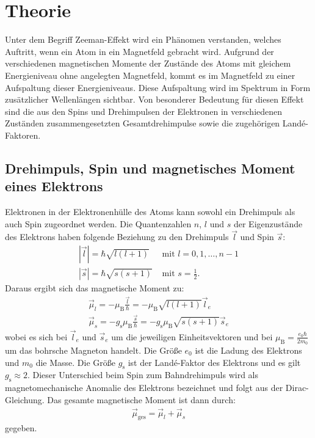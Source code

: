 
\section{Theorie}
\label{sec:Theorie}

Unter dem Begriff Zeeman-Effekt wird ein Phänomen verstanden, welches Auftritt, wenn ein Atom in ein Magnetfeld gebracht wird. Aufgrund der verschiedenen magnetischen Momente der Zustände des Atoms mit gleichem Energieniveau ohne angelegten Magnetfeld, kommt es im Magnetfeld zu einer Aufspaltung dieser Energieniveaus. Diese Aufspaltung wird im Spektrum in Form zusätzlicher Wellenlängen sichtbar. Von besonderer Bedeutung für diesen Effekt sind die aus den Spins und Drehimpulsen der Elektronen in verschiedenen Zuständen zusammengesetzten Gesamtdrehimpulse sowie die zugehörigen Landé-Faktoren.


\subsection{Drehimpuls, Spin und magnetisches Moment eines Elektrons}
Elektronen in der Elektronenhülle des Atoms kann sowohl ein Drehimpuls als auch Spin zugeordnet werden. Die Quantenzahlen $n$, $l$ und $s$ der Eigenzustände des Elektrons haben folgende Beziehung zu den Drehimpuls $\vec{l}$ und Spin $\vec{s}$:
\begin{align*}
	|\vec{l}|= \hbar \sqrt{l(l+1)} & \text{ mit } l=0, 1, \hdots, n-1\\
	|\vec{s}|= \hbar \sqrt{s(s+1)} & \text{ mit } s=\frac{1}{2}.
\end{align*}
Daraus ergibt sich das magnetische Moment zu:
\begin{gather*}
	\vec{\mu}_l=-\mu_\text{B} \frac{\vec{l}}{\hbar}=-\mu_\text{B} \sqrt{l(l+1)} \vec{l}_e \\
	\vec{\mu}_s=- g_\text{s} \mu_\text{B} \frac{\vec{s}}{\hbar}=- g_\text{s} \mu_\text{B} \sqrt{s(s+1)} \vec{s}_e
\end{gather*}
wobei es sich bei $\vec{l}_e$ und $\vec{s}_e$ um die jeweiligen Einheitsvektoren und bei $\mu_\text{B}=\frac{e_0 \hbar}{2 m_0}$ um das bohrsche Magneton handelt. Die Größe $e_0$ ist die Ladung des Elektrons und $m_0$ die Masse. Die Größe $g_\text{s}$ ist der Landé-Faktor des Elektrons und es gilt $g_\text{s} \approx 2$. Dieser Unterschied beim Spin zum Bahndrehimpuls wird als magnetomechanische Anomalie des Elektrons bezeichnet und folgt aus der Dirac-Gleichung. Das gesamte magnetische Moment ist dann durch:
\begin{gather*}
	\vec{\mu}_\text{ges}= \vec{\mu}_l+\vec{\mu}_s
\end{gather*}
gegeben.

